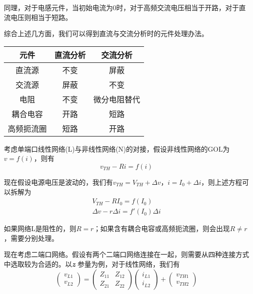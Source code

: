 \documentclass[UTF8,openany]{ctexbook}
\begin{document}
    \par 同理，对于电感元件，当初始电流为0时，对于高频交流电压相当于开路，对于直流电压则相当于短路。
    \par 综合上述几方面，我们可以得到直流与交流分析时的元件处理办法。
    \begin{center}
    \begin{tabular}{|c|c|c|}
        \hline
        \bfseries 元件 & \bfseries 直流分析 & \bfseries 交流分析 \\
        \hline
        直流源 & 不变 & 屏蔽 \\
        \hline
        交流源 & 屏蔽 & 不变 \\
        \hline
        电阻 & 不变 & 微分电阻替代 \\
        \hline
        耦合电容 & 开路 & 短路 \\
        \hline
        高频扼流圈 & 短路 & 开路 \\
        \hline
    \end{tabular}
    \end{center}
    \par 考虑单端口线性网络(L)与非线性网络(N)的对接，假设非线性网络的GOL为$v=f(i)$，则有
    \[
    v_{TH}-Ri=f(i)    
    \]
    \par 现在假设电源电压是波动的，我们有$v_{TH}=V_{TH}+\Delta v$，$i=I_0+\Delta i$，则上述方程可以拆解为
    \begin{align*}
        V_{TH}-RI_0=f(I_0)\\
        \Delta v-r\Delta i=f'(I_0)\Delta i
    \end{align*}
    \par 如果网络L是阻性的，则$R=r$；如果含有耦合电容或高频扼流圈，则会出现$R\neq r$，需要分别处理。
    \par 现在考虑二端口网络。假设有两个二端口网络连接在一起，则需要从四种连接方式中选取较为合适的。以\textbf{\textit{z}}
    参量为例，对于线性网络，我们有
    \[
    \begin{pmatrix}
        v_{L1} \\ v_{L2}
    \end{pmatrix}
    =
    \begin{pmatrix}
        Z_{11} & Z_{12} \\ Z_{21} & Z_{22}
    \end{pmatrix}
    \begin{pmatrix}
        i_{L1} \\ i_{L2}
    \end{pmatrix}
    +
    \begin{pmatrix}
        v_{TH1} \\ v_{TH2}
    \end{pmatrix}
    \]
\end{document}
